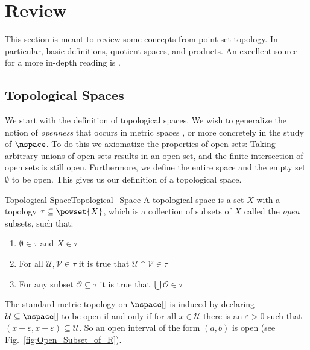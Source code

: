 \section{Review}
    This section is meant to review some concepts from point-set topology. In
    particular, basic definitions, quotient spaces, and products. An excellent
    source for a more in-depth reading is \cite{Munkres2000}.
    \subsection{Topological Spaces}
        We start with the definition of topological spaces. We wish to
        generalize the notion of \textit{openness} that occurs in metric spaces%
        , or more concretely in the study of $\nspace$. To
        do this we axiomatize the properties of open sets: Taking arbitrary
        unions of open sets results in an open set, and the finite intersection
        of open sets is still open. Furthermore, we define the entire space and
        the empty set $\emptyset$ to be open. This gives us our definition of a
        topological space.
        \begin{fdefinition}{Topological Space}{Topological_Space}
            A topological space is a set $X$ with a topology
            $\tau\subseteq\powset{X}$, which is a collection of subsets
            of $X$ called the \textit{open} subsets, such that:
            \begin{enumerate}
                \item \label{def:top:Empty_and_X_Open}%
                      $\emptyset\in\tau$ and $X\in\tau$
                \item \label{def:top:Finite_Intersections}%
                      For all $\mathcal{U},\mathcal{V}\in\tau$ it is
                      true that $\mathcal{U}\cap\mathcal{V}\in\tau$
                \item \label{def:top:Arbitrary_Unions}%
                      For any subset $\mathcal{O}\subseteq\tau$ it is
                      true that $\bigcup\mathcal{O}\in\tau$
            \end{enumerate}
        \end{fdefinition}
        \begin{example}
            The standard metric topology on $\nspace[]$ is induced by
            declaring $\mathcal{U}\subseteq\nspace[]$ to be open if and
            only if for all $x\in\mathcal{U}$ there is an
            $\varepsilon>0$ such that
            $(x-\varepsilon,x+\varepsilon)\subseteq\mathcal{U}$. So an
            open interval of the form $(a,b)$ is open
            (see Fig.~\ref{fig:Open_Subset_of_R}).%
        \end{example}
